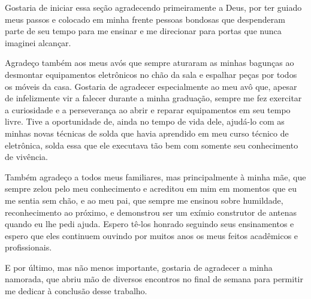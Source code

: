 \begin{agradecimentos}
Gostaria de iniciar essa seção agradecendo primeiramente a Deus, por ter guiado meus passos e colocado em minha frente pessoas bondosas que despenderam parte de seu tempo para me ensinar e me direcionar para portas que nunca imaginei alcançar.

Agradeço também aos meus avós que sempre aturaram as minhas bagunças ao desmontar equipamentos eletrônicos no chão da sala e espalhar peças por todos os móveis da casa.
Gostaria de agradecer especialmente ao meu avô que, apesar de infelizmente vir a falecer durante a minha graduação, sempre me fez exercitar a curiosidade e a perseverança ao abrir e reparar equipamentos em seu tempo livre.
Tive a oportunidade de, ainda no tempo de vida dele, ajudá-lo com as minhas novas técnicas de solda que havia aprendido em meu curso técnico de eletrônica, solda essa que ele executava tão bem com somente seu conhecimento de vivência.

Também agradeço a todos meus familiares, mas principalmente à minha mãe, que sempre zelou pelo meu conhecimento e acreditou em mim em momentos que eu me sentia sem chão, e ao meu pai, que sempre me ensinou sobre humildade, reconhecimento ao próximo, e demonstrou ser um exímio construtor de antenas quando eu lhe pedi ajuda.
Espero tê-los honrado seguindo seus ensinamentos e espero que eles continuem ouvindo por muitos anos os meus feitos acadêmicos e profissionais.

E por último, mas não menos importante, gostaria de agradecer a minha namorada, que abriu mão de diversos encontros no final de semana para permitir me dedicar à conclusão desse trabalho.

\end{agradecimentos}
